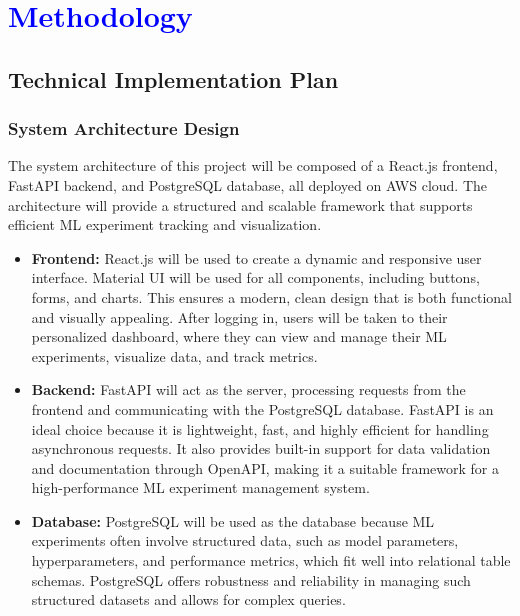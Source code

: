 \documentclass[12pt]{article}
\newcommand{\tb}{\textcolor{blue}}
\begin{document}
\section{\tb{Methodology}}
\subsection{Technical Implementation Plan}

\subsubsection{System Architecture Design}

The system architecture of this project will be composed of a React.js frontend, FastAPI backend, and PostgreSQL database, all deployed on AWS cloud. The architecture will provide a structured and scalable framework that supports efficient ML experiment tracking and visualization.

\begin{itemize}

\item \textbf{Frontend:} React.js will be used to create a dynamic and responsive user interface. Material UI will be used for all components, including buttons, forms, and charts. This ensures a modern, clean design that is both functional and visually appealing. After logging in, users will be taken to their personalized dashboard, where they can view and manage their ML experiments, visualize data, and track metrics.

\item \textbf{Backend:} FastAPI will act as the server, processing requests from the frontend and communicating with the PostgreSQL database. FastAPI is an ideal choice because it is lightweight, fast, and highly efficient for handling asynchronous requests. It also provides built-in support for data validation and documentation through OpenAPI, making it a suitable framework for a high-performance ML experiment management system.

\item \textbf{Database:} PostgreSQL will be used as the database because ML experiments often involve structured data, such as model parameters, hyperparameters, and performance metrics, which fit well into relational table schemas. PostgreSQL offers robustness and reliability in managing such structured datasets and allows for complex queries.

\end{itemize}
\end{document}
